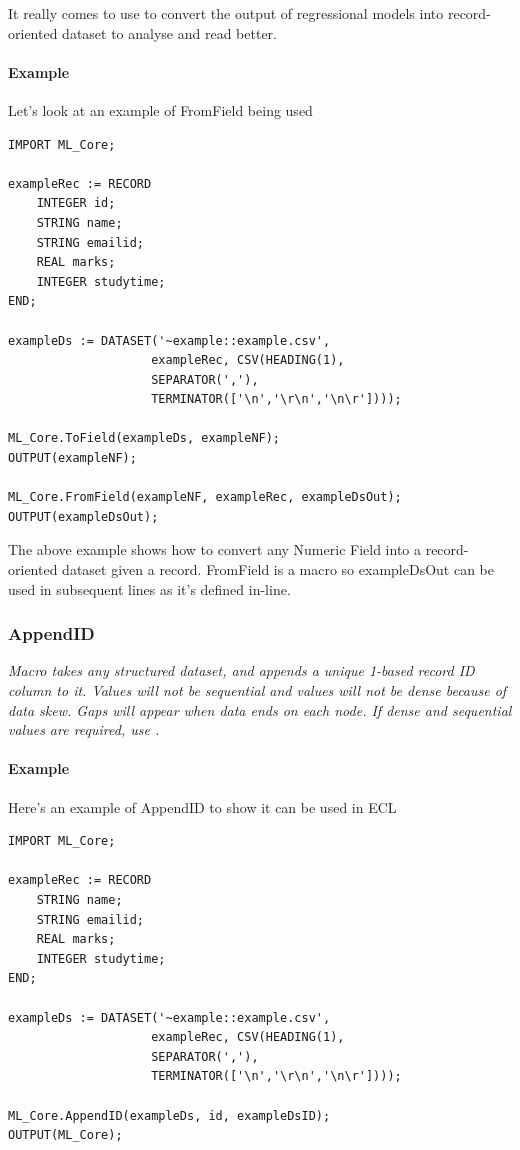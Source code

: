 It really comes to use to convert the output of regressional models into record-oriented dataset to analyse and read better. 

\paragraph{Example}

Let's look at an example of FromField being used

\begin{lstlisting}
IMPORT ML_Core;

exampleRec := RECORD
    INTEGER id;
    STRING name;
    STRING emailid;
    REAL marks;
    INTEGER studytime;
END;

exampleDs := DATASET('~example::example.csv', 
                    exampleRec, CSV(HEADING(1),
                    SEPARATOR(','),
                    TERMINATOR(['\n','\r\n','\n\r'])));

ML_Core.ToField(exampleDs, exampleNF);
OUTPUT(exampleNF);

ML_Core.FromField(exampleNF, exampleRec, exampleDsOut);
OUTPUT(exampleDsOut);
\end{lstlisting}

The above example shows how to convert any Numeric Field into a record-oriented dataset given a record. FromField is a macro so exampleDsOut can be used in subsequent lines as it's defined in-line.

\subsubsection{AppendID}\label{mlcore:appendid}

\textit{Macro takes any structured dataset, and appends a unique 1-based record ID column to it. Values will not be sequential and values will not be dense because of data skew. Gaps will appear when data ends on each node. If dense and sequential values are required, use .}

\paragraph{Example}

Here's an example of AppendID to show it can be used in ECL

\begin{lstlisting}
IMPORT ML_Core;

exampleRec := RECORD
    STRING name;
    STRING emailid;
    REAL marks;
    INTEGER studytime;
END;

exampleDs := DATASET('~example::example.csv', 
                    exampleRec, CSV(HEADING(1),
                    SEPARATOR(','),
                    TERMINATOR(['\n','\r\n','\n\r'])));

ML_Core.AppendID(exampleDs, id, exampleDsID);
OUTPUT(ML_Core);
\end{lstlisting}

